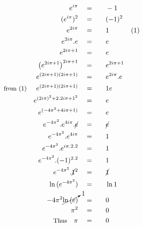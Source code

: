 \begin{alignat*}{5}
&\,&e^{i\pi}\quad&=\quad&&-1\\
&\,&(e^{i\pi})^2\quad&=&&(-1)^2\\
&\,&e^{2i\pi}\quad&=&&1\quad&\small(1)\\
&\,&e^{2i\pi}.e\quad&=&&e\\
&\,&e^{2i\pi+1}\quad&=&&e\\
&\,&\left(e^{2i\pi+1}\right)^{2i\pi+1}\quad&=&&e^{2i\pi+1}\\
&\,&e^{(2i\pi+1)(2i\pi+1)}\quad&=&&e^{2i\pi}.e\\
&\small\text{from (1)}&e^{(2i\pi+1)(2i\pi+1)}\quad&=&&1e\\
&\,&e^{(2i\pi)^2+2.2i\pi+1^2}\quad&=&&e\\
&\,&e^{(-4\pi^2+4i\pi+1)}\quad&=&&e\\
&\,&e^{-4\pi^2}.e^{4i\pi}.\cancel{e}\quad&=&&\cancel{e}\\
&\,&e^{-4\pi^2}.e^{4i\pi}\quad&=&&1\\
&\,&e^{-4\pi^2}.e^{i\pi.2.2}\quad&=&&1\\
&\,&e^{-4\pi^2}.(-1)^{2.2}\quad&=&&1\\
&\,&e^{-4\pi^2}.\cancel{1}^2\quad&=&&\cancel{1}\\
&\,&\ln{(e^{-4\pi^2})}\quad&=&&\ln1\\
&\,&-4\pi^2\cancelto{1}{\ln{(e)}}\quad&=&&0\\
&\,&\pi^2\quad&=&&0\\
&\,&\small\text{Thus}\normalsize\quad\pi\quad&=&&0
\end{alignat*}
